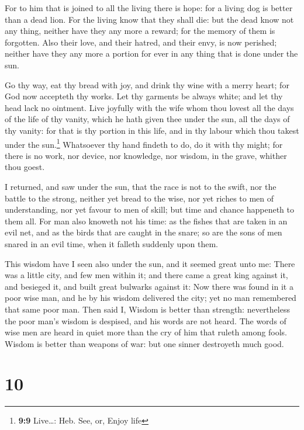  For to him that is joined to all the living there is
hope: for a living dog is better than a dead lion.  For
the living know that they shall die: but the dead know not any thing,
neither have they any more a reward; for the memory of them is
forgotten.  Also their love, and their hatred, and their
envy, is now perished; neither have they any more a portion for ever in
any thing that is done under the sun.

 Go thy way, eat thy bread with joy, and drink thy wine
with a merry heart; for God now accepteth thy works.  Let
thy garments be always white; and let thy head lack no ointment.
 Live joyfully with the wife whom thou lovest all the days
of the life of thy vanity, which he hath given thee under the sun, all
the days of thy vanity: for that is thy portion in this life, and in thy
labour which thou takest under the sun.\footnote{\textbf{9:9}
  Live\ldots: Heb. See, or, Enjoy life}  Whatsoever thy
hand findeth to do, do it with thy might; for there is no work, nor
device, nor knowledge, nor wisdom, in the grave, whither thou goest.

 I returned, and saw under the sun, that the race is not
to the swift, nor the battle to the strong, neither yet bread to the
wise, nor yet riches to men of understanding, nor yet favour to men of
skill; but time and chance happeneth to them all.  For
man also knoweth not his time: as the fishes that are taken in an evil
net, and as the birds that are caught in the snare; so are the sons of
men snared in an evil time, when it falleth suddenly upon them.

 This wisdom have I seen also under the sun, and it
seemed great unto me:  There was a little city, and few
men within it; and there came a great king against it, and besieged it,
and built great bulwarks against it:  Now there was found
in it a poor wise man, and he by his wisdom delivered the city; yet no
man remembered that same poor man.  Then said I, Wisdom
is better than strength: nevertheless the poor man's wisdom is despised,
and his words are not heard.  The words of wise men are
heard in quiet more than the cry of him that ruleth among fools.
 Wisdom is better than weapons of war: but one sinner
destroyeth much good.

\hypertarget{section-9}{%
\section{10}\label{section-9}}

